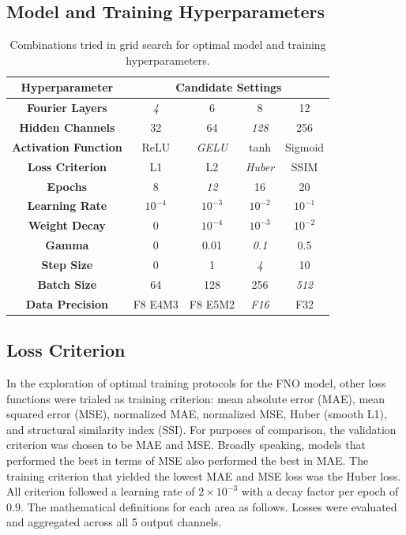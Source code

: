\documentclass[preprint,review,12pt]{elsarticle}
\begin{document}
\subsection{Model and Training Hyperparameters}
\begin{table}[H]
    \centering
    \begin{tabular}{|c|c|c|c|c|}
        \hline
        \textbf{Hyperparameter} &
        \multicolumn{4}{c|}{\textbf{Candidate Settings}} \\ \hline
    
        \textbf{Fourier Layers} & \textit{4} & 6 & 8 & 12 \\ \hline
        \textbf{Hidden Channels} & 32 & 64 & \textit{128} & 256 \\ \hline
        \textbf{Activation Function} & ReLU & \textit{GELU} & tanh & Sigmoid \\ \hline
        \textbf{Loss Criterion} & L1 & L2 & \textit{Huber} & SSIM \\ \hline
        \textbf{Epochs} & 8 & \textit{12} & 16 & 20 \\ \hline
        \textbf{Learning Rate} & $10^{-4}$ & \textit{$10^{-3}$} & $10^{-2}$ & $10^{-1}$ \\ \hline
        \textbf{Weight Decay} & 0 & \textit{$10^{-4}$} & $10^{-3}$ & $10^{-2}$ \\ \hline
        \textbf{Gamma} & 0 & 0.01 & \textit{0.1} & 0.5 \\ \hline
        \textbf{Step Size} & 0 & 1 & \textit{4} & 10 \\ \hline
        \textbf{Batch Size} & 64 & 128 & 256 & \textit{512} \\ \hline
        \textbf{Data Precision} & F8 E4M3 & F8 E5M2 & \textit{F16} & F32 \\ \hline
    \end{tabular}
    \caption{Combinations tried in grid search for optimal model and training hyperparameters.}
    \label{tab:training_hyperparameters}
\end{table}

\subsection{Loss Criterion}
In the exploration of optimal training protocols for the FNO model, other loss functions were trialed as training criterion: mean absolute error (MAE), mean squared error (MSE), normalized MAE, normalized MSE, Huber (smooth L1), and structural similarity index (SSI). For purposes of comparison, the validation criterion was chosen to be MAE and MSE. Broadly speaking, models that performed the best in terms of MSE also performed the best in MAE. The training criterion that yielded the lowest MAE and MSE loss was the Huber loss. All criterion followed a learning rate of $2\times10^{-3}$ with a decay factor per epoch of $0.9$. The mathematical definitions for each area as follows. Losses were evaluated and aggregated across all 5 output channels. 
\end{document}
